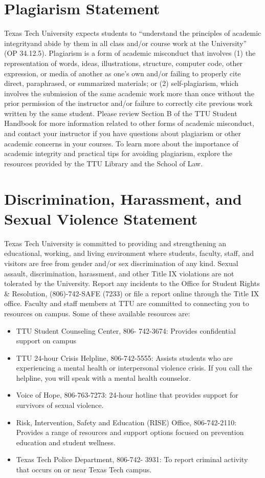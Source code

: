 \documentclass[12pt, notitlepage]{article}   	%
\begin{document}
{\section{Plagiarism Statement}
Texas Tech University expects students to “understand the principles of academic integrityand abide by them in all class and/or course work at the University” (OP 34.12.5). Plagiarism is a form of academic misconduct that involves (1) the representation of words,  ideas, illustrations, structure, computer code, other expression, or media of another as one's own and/or failing to properly cite direct, paraphrased, or summarized materials; or (2) self-plagiarism, which involves the submission of the same academic work more than once without the prior permission of the instructor and/or failure to correctly cite previous work written by the same student. Please review Section B of the TTU Student Handbook for more information related to other forms of academic misconduct, and contact your instructor if you have questions about plagiarism or other academic concerns in your courses. To learn more about the importance of academic integrity and practical tips for avoiding plagiarism, explore the resources provided by the TTU Library and the School of Law.

\section{Discrimination, Harassment, and Sexual Violence Statement}
Texas Tech University is committed to providing and strengthening an educational, working, and living environment where students, faculty, staff, and visitors are free from gender and/or sex discrimination of any kind. Sexual assault, discrimination, harassment, and other Title IX violations are not tolerated by the University. Report any incidents to the Office for Student Rights & Resolution, (806)-742-SAFE (7233) or file a report online through the Title IX office. Faculty and staff members at TTU are committed to connecting you to resources on campus. Some of these available resources are:
\begin{itemize}
    \item TTU Student Counseling Center, 806- 742-3674: Provides confidential support on campus
    \item TTU 24-hour Crisis Helpline, 806-742-5555: Assists students who are experiencing a mental health or interpersonal violence crisis. If you call the helpline, you will speak with a mental health counselor.
    \item Voice of Hope, 806-763-7273: 24-hour hotline that provides support for survivors of sexual violence.
    \item Risk, Intervention, Safety and Education (RISE) Office, 806-742-2110: Provides a range of resources and support options focused on prevention education and student wellness.
    \item Texas Tech Police Department, 806-742- 3931: To report criminal activity that occurs on or near Texas Tech campus.
\end{itemize}

}
\end{document}
